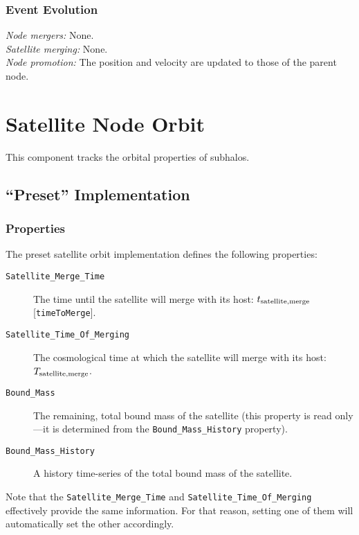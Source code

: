 \subsubsection{Event Evolution}

\noindent\emph{Node mergers:} None.\\

\noindent\emph{Satellite merging:} None.\\

\noindent\emph{Node promotion:} The position and velocity are updated to those of the parent node.\\

\section{Satellite Node Orbit}

This component tracks the orbital properties of subhalos.

\subsection{``Preset'' Implementation}

\subsubsection{Properties}

The preset satellite orbit implementation defines the following properties:
\begin{description}
 \item [{\tt Satellite\_Merge\_Time}] The time until the satellite will merge with its host: $t_{\rm satellite, merge}$ [{\tt timeToMerge}].
 \item [{\tt Satellite\_Time\_Of\_Merging}] The cosmological time at which the satellite will merge with its host: $T_{\rm satellite, merge}$.
 \item [{\tt Bound\_Mass}] The remaining, total bound mass of the satellite (this property is read only---it is determined from the {\tt Bound\_Mass\_History} property).
 \item [{\tt Bound\_Mass\_History}] A history time-series of the total bound mass of the satellite.
\end{description}

Note that the {\tt Satellite\_Merge\_Time} and {\tt Satellite\_Time\_Of\_Merging} effectively provide the same information. For that reason, setting one of them will automatically set the other accordingly.

